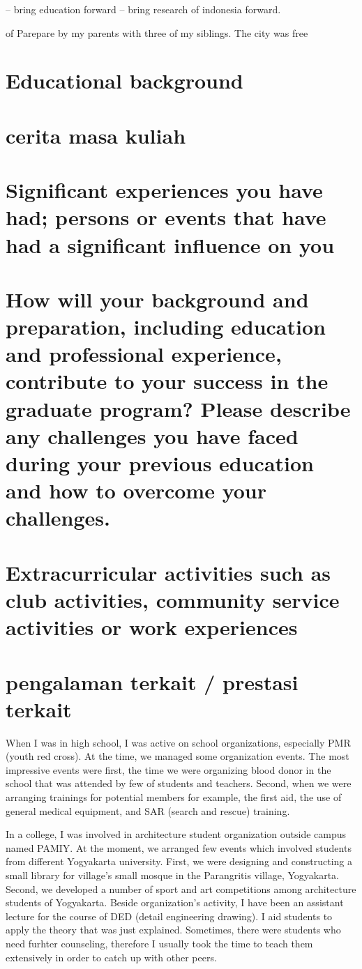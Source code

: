\documentclass[11pt]{simart} %
\begin{document}
-- bring education forward
-- bring research of indonesia forward.

of Parepare by my parents with three of my siblings.
The city was free

\section{Educational background}
\section*{cerita masa kuliah}

\section{Significant experiences you have had; persons or events that have had a significant influence on you}
\section*{How will your background and preparation, including education and professional experience, contribute to your success in the graduate program? Please describe any challenges you have faced during your previous education and how to overcome your challenges.}

\section{Extracurricular activities such as club activities, community service activities or work experiences}
\section*{pengalaman terkait / prestasi terkait}
When I was in high school, I was active on school organizations, especially PMR (youth red cross). At the time, we managed some organization events. The most impressive events were first, the time we were organizing blood donor in the school that was attended by few of students and teachers. Second, when we were arranging trainings for potential members for example, the first aid, the use of general medical equipment, and SAR (search and rescue) training.

In a college, I was involved in architecture student organization outside campus named PAMIY. At the moment, we arranged few events which involved students from different Yogyakarta university. First, we were designing and constructing a small library for village's small mosque in the Parangritis village, Yogyakarta. Second, we developed a number of sport and art competitions among architecture students of Yogyakarta. Beside organization's activity, I have been an assistant lecture for the course of DED (detail engineering drawing). I aid students to apply the theory that was just explained. Sometimes, there were  students who need furhter counseling, therefore I usually took the time to teach them extensively in order to catch up with other peers.
\end{document}
